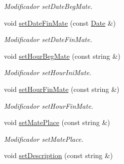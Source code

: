 \begin{DoxyCompactItemize}
\begin{DoxyCompactList}\small\item\em Modificador set\+Date\+Beg\+Mate. \end{DoxyCompactList}\item 
void \hyperlink{class_event_a3db2bff0709f6a5c319156110adbd3f8}{set\+Date\+Fin\+Mate} (const \hyperlink{class_date}{Date} \&)\hypertarget{class_event_a3db2bff0709f6a5c319156110adbd3f8}{}\label{class_event_a3db2bff0709f6a5c319156110adbd3f8}

\begin{DoxyCompactList}\small\item\em Modificador set\+Date\+Fin\+Mate. \end{DoxyCompactList}\item 
void \hyperlink{class_event_aa2c3518efa76db0a6378c29ce3a1b26d}{set\+Hour\+Beg\+Mate} (const string \&)\hypertarget{class_event_aa2c3518efa76db0a6378c29ce3a1b26d}{}\label{class_event_aa2c3518efa76db0a6378c29ce3a1b26d}

\begin{DoxyCompactList}\small\item\em Modificador set\+Hour\+Ini\+Mate. \end{DoxyCompactList}\item 
void \hyperlink{class_event_afc2bf9461dd17d3dbd9e0ba916047475}{set\+Hour\+Fin\+Mate} (const string \&)\hypertarget{class_event_afc2bf9461dd17d3dbd9e0ba916047475}{}\label{class_event_afc2bf9461dd17d3dbd9e0ba916047475}

\begin{DoxyCompactList}\small\item\em Modificador set\+Hour\+Fin\+Mate. \end{DoxyCompactList}\item 
void \hyperlink{class_event_aa46b4491846fb1fb00dee0e5b9e0def3}{set\+Mate\+Place} (const string \&)\hypertarget{class_event_aa46b4491846fb1fb00dee0e5b9e0def3}{}\label{class_event_aa46b4491846fb1fb00dee0e5b9e0def3}

\begin{DoxyCompactList}\small\item\em Modificador set\+Mate\+Place. \end{DoxyCompactList}\item 
void \hyperlink{class_event_a253202af08bc7a6e7f74d9e0b00c8153}{set\+Description} (const string \&)\hypertarget{class_event_a253202af08bc7a6e7f74d9e0b00c8153}{}\label{class_event_a253202af08bc7a6e7f74d9e0b00c8153}


\end{DoxyCompactItemize}
